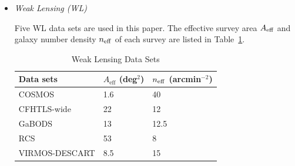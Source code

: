 \documentclass[a4paper,11pt]{article}
\begin{document}
\begin{itemize}
\item{\it Weak Lensing (WL)}

Five WL data sets are used in this paper. The effective survey area
$A_{\rm eff}$ and galaxy number density $n_{\rm eff}$ of
each survey are listed in Table~\ref{tab:wldata}.

\begin{table}
\begin{center}
  \caption{Weak Lensing Data Sets}
  \begin{tabular}{lll}
    \hline
    Data sets & $A_{\textrm{eff}}$ (deg$^2$)  &  $n_{\rm eff}$  (arcmin$^{-2}$) \\
    \hline
    COSMOS\cite{Massey2007,Lesgourgues2007}  & 1.6 & 40\\
    CFHTLS-wide\cite{Hoekstra2006,Schimd2007}& 22 & 12 \\
    GaBODS\cite{Hoekstra2002a,Hoekstra2002b} & 13 & 12.5 \\
    RCS\cite{Hoekstra2002a,Hoekstra2002b} & 53 & 8 \\
    VIRMOS-DESCART\cite{Van-Waerbeke2005,Schimd2007} & 8.5 &  15 \\
    \hline
  \end{tabular}
  \label{tab:wldata}
\end{center}
\end{table}


\end{itemize}
\end{document}
